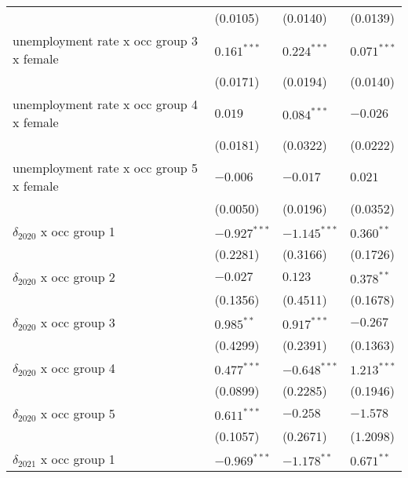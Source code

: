 \begin{tabular}{llll}
                                         &           (0.0105) &           (0.0140) &           (0.0139) \\
unemployment rate x occ group 3 x female &      $0.161^{***}$ &      $0.224^{***}$ &      $0.071^{***}$ \\
                                         &           (0.0171) &           (0.0194) &           (0.0140) \\
unemployment rate x occ group 4 x female &            $0.019$ &      $0.084^{***}$ &           $-0.026$ \\
                                         &           (0.0181) &           (0.0322) &           (0.0222) \\
unemployment rate x occ group 5 x female &           $-0.006$ &           $-0.017$ &            $0.021$ \\
                                         &           (0.0050) &           (0.0196) &           (0.0352) \\
$\delta_{2020}$ x occ group 1            &     $-0.927^{***}$ &     $-1.145^{***}$ &       $0.360^{**}$ \\
                                         &           (0.2281) &           (0.3166) &           (0.1726) \\
$\delta_{2020}$ x occ group 2            &           $-0.027$ &            $0.123$ &       $0.378^{**}$ \\
                                         &           (0.1356) &           (0.4511) &           (0.1678) \\
$\delta_{2020}$ x occ group 3            &       $0.985^{**}$ &      $0.917^{***}$ &           $-0.267$ \\
                                         &           (0.4299) &           (0.2391) &           (0.1363) \\
$\delta_{2020}$ x occ group 4            &      $0.477^{***}$ &     $-0.648^{***}$ &      $1.213^{***}$ \\
                                         &           (0.0899) &           (0.2285) &           (0.1946) \\
$\delta_{2020}$ x occ group 5            &      $0.611^{***}$ &           $-0.258$ &           $-1.578$ \\
                                         &           (0.1057) &           (0.2671) &           (1.2098) \\
$\delta_{2021}$ x occ group 1            &     $-0.969^{***}$ &      $-1.178^{**}$ &       $0.671^{**}$ \\

\end{tabular}
